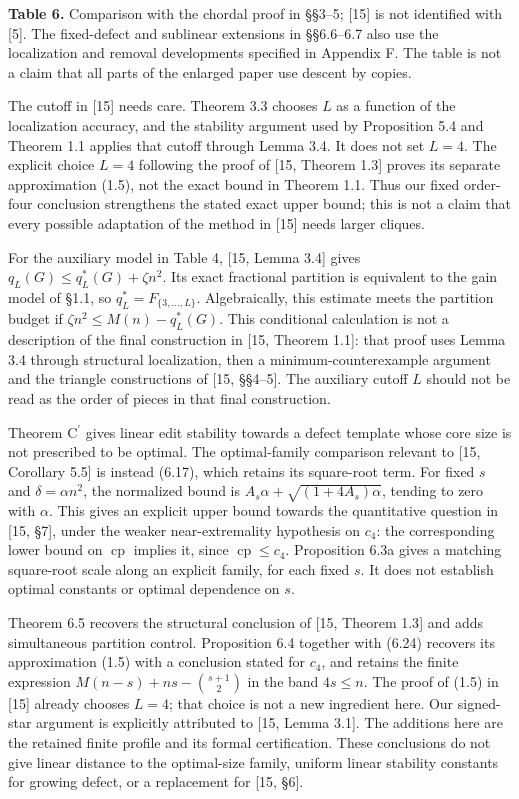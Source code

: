 \documentclass[english,11pt,a4paper]{article}
\begin{document}
\textbf{Table 6.} Comparison with the chordal proof in §§3--5; {[}15{]} is not identified with {[}5{]}. The fixed-defect and sublinear extensions in §§6.6--6.7 also use the localization and removal developments specified in Appendix F. The table is not a claim that all parts of the enlarged paper use descent by copies.

The cutoff in {[}15{]} needs care. Theorem 3.3 chooses \(L\) as a function of the localization accuracy, and the stability argument used by Proposition 5.4 and Theorem 1.1 applies that cutoff through Lemma 3.4. It does not set \(L=4\). The explicit choice \(L=4\) following the proof of {[}15, Theorem 1.3{]} proves its separate approximation (1.5), not the exact bound in Theorem 1.1. Thus our fixed order-four conclusion strengthens the stated exact upper bound; this is not a claim that every possible adaptation of the method in {[}15{]} needs larger cliques.

For the auxiliary model in Table 4, {[}15, Lemma 3.4{]} gives \(q_L(G)\le q_L^*(G)+\zeta n^2\). Its exact fractional partition is equivalent to the gain model of §1.1, so \(q_L^*=F_{\{3,\ldots,L\}}\). Algebraically, this estimate meets the partition budget if \(\zeta n^2\le M(n)-q_L^*(G)\). This conditional calculation is not a description of the final construction in {[}15, Theorem 1.1{]}: that proof uses Lemma 3.4 through structural localization, then a minimum-counterexample argument and the triangle constructions of {[}15, §§4--5{]}. The auxiliary cutoff \(L\) should not be read as the order of pieces in that final construction.

Theorem \texorpdfstring{C\ensuremath{^{\prime}}}{C'} gives linear edit stability towards a defect template whose core size is not prescribed to be optimal. The optimal-family comparison relevant to {[}15, Corollary 5.5{]} is instead (6.17), which retains its square-root term. For fixed \(s\) and \(\delta=\alpha n^2\), the normalized bound is \(A_s\alpha+\sqrt{(1+4A_s)\alpha}\), tending to zero with \(\alpha\). This gives an explicit upper bound towards the quantitative question in {[}15, §7{]}, under the weaker near-extremality hypothesis on \(c_4\): the corresponding lower bound on \(\operatorname{cp}\) implies it, since \(\operatorname{cp}\le c_4\). Proposition 6.3a gives a matching square-root scale along an explicit family, for each fixed \(s\). It does not establish optimal constants or optimal dependence on \(s\).

Theorem 6.5 recovers the structural conclusion of {[}15, Theorem 1.3{]} and adds simultaneous partition control. Proposition 6.4 together with (6.24) recovers its approximation (1.5) with a conclusion stated for \(c_4\), and retains the finite expression \(M(n-s)+ns-\binom{s+1}{2}\) in the band \(4s\le n\). The proof of (1.5) in {[}15{]} already chooses \(L=4\); that choice is not a new ingredient here. Our signed-star argument is explicitly attributed to {[}15, Lemma 3.1{]}. The additions here are the retained finite profile and its formal certification. These conclusions do not give linear distance to the optimal-size family, uniform linear stability constants for growing defect, or a replacement for {[}15, §6{]}.
\end{document}

